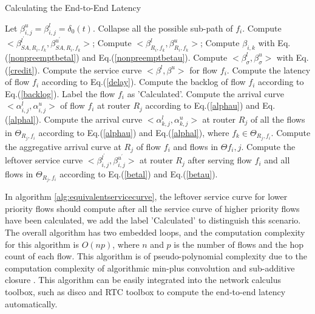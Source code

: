 \documentclass[10pt,journal]{IEEEtran}
\begin{document}
\begin{algorithm}
\caption{Calculating the End-to-End Latency}
\label{alg:equivalentservicecurve}
\begin{algorithmic}[1]
            \STATE Let $\beta_{i,j}^u=\beta_{i,j}^l=\delta_0(t)$.
        \ENDFOR
    \ENDFOR
        \STATE Collapse all the possible sub-path of $f_i$.
                \STATE Compute $<\beta_{SA,R_i,f_k}^{l^\prime},\beta_{SA,R_i,f_k}^{u^\prime}>$;
                \STATE Compute $<\beta_{R_i,f_k}^l,\beta_{R_i,f_k}^u>$;
                \ENDFOR
            \ENDIF
                \STATE Compute $\beta_{i,k}$ with Eq.(\ref{nonpreemptbetal}) and Eq.(\ref{nonpreemptbetau}).
            \ENDIF
        \ENDFOR
        \STATE Compute $<\beta_\sigma^l,\beta_\sigma^u>$ with Eq.(\ref{credit}).
        \STATE Compute the service curve $<\beta^l,\beta^u>$ for flow $f_i$.
        \STATE Compute the latency of flow $f_i$ according to Eq.(\ref{delay}).
        \STATE Compute the backlog of flow $f_i$ according to Eq.(\ref{backlog}).
        \STATE Label the flow $f_i$ as 'Calculated'.
                \STATE Compute the arrival curve $<\alpha^l_{i,j},\alpha^u_{i,j}>$ of flow $f_i$ at router $R_j$ according to Eq.(\ref{alphau}) and Eq.(\ref{alphal}).
                \STATE Compute the arrival curve $<\alpha^l_{k,j},\alpha^u_{k,j}>$ at router $R_j$ of all the flows in $\Theta_{R_j,f_i}$ according to Eq.(\ref{alphau}) and Eq.(\ref{alphal}), where $f_k\in\Theta_{R_j,f_i}$.
                \STATE Compute the aggregative arrival curve at $R_j$ of  flow $f_i$ and flows in $\Theta{f_i,j}$.
                \STATE Compute the leftover service curve $<\beta^{l^\prime}_{i,j},\beta^{u^\prime}_{i,j}>$ at router $R_j$ after serving flow $f_i$ and all flows in $\Theta_{R_j,f_i}$ according to Eq.(\ref{betal}) and Eq.(\ref{betau}).
            \ENDIF
        \ENDFOR
    \ENDFOR
\end{algorithmic}
\end{algorithm}

In algorithm \ref{alg:equivalentservicecurve}, the leftover service curve for lower priority flows should compute after all the service curve of higher priority flows have been calculated, we add the label 'Calculated' to distinguish this scenario. The overall algorithm has two embedded loops, and the computation complexity for this algorithm is $O(np)$, where $n$ and $p$ is the number of flows and the hop count of each flow. This algorithm is of pseudo-polynomial complexity due to the computation complexity of algorithmic min-plus convolution and sub-additive closure \cite{Bouillard2008}. This algorithm can be easily integrated into the network calculus toolbox, such as disco\cite{5755058} and RTC toolbox\cite{rtc} to compute the end-to-end latency automatically.
\end{document}
